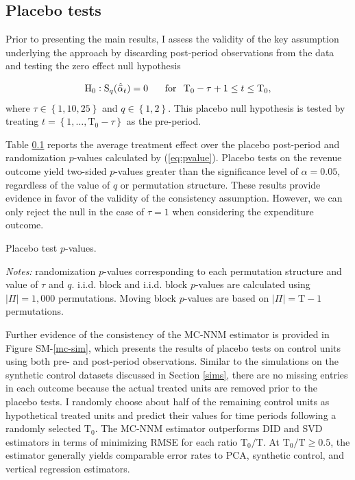 \documentclass[hidelinks,12pt]{article}
\begin{document}
\subsection{Placebo tests} \label{placebo-tests}

Prior to presenting the main results, I assess the validity of the key assumption underlying the approach by discarding post-period observations from the data and testing the zero effect null hypothesis 

\begin{equation} \label{h0-placebo}
\text{H}_0: \text{S}_q (\hat{\bar{\alpha}}_{t}) = 0  \, \hspace{5mm} \,  \text{for} \, \hspace{2mm}  \text{T}_0 - \tau +1 \leq t \leq  \text{T}_0,
\end{equation}
\noindent
where $\tau \in \left\{1, 10, 25\right\}$ and $q \in \left\{1, 2\right\}$. This placebo null hypothesis is tested by treating $t = \left\{1, \ldots,  \text{T}_0 - \tau\right\}$ as the pre-period.

Table \ref{placebo-tests} reports the average treatment effect over the placebo post-period and randomization $p$-values calculated by (\ref{eq:pvalue}). Placebo tests on the revenue outcome yield two-sided $p$-values greater than the significance level of $\alpha = 0.05$, regardless of the value of $q$ or permutation structure. These results provide evidence in favor of the validity of the consistency assumption. However, we can only reject the null in the case of $\tau=1$ when considering the expenditure outcome. 

\begin{table}[htbp]
	\captionsetup{font=normalsize}
	\caption{Placebo test $p$-values.\label{placebo-tests}}
	\begin{center}
		\scalebox{.95}{}
	\end{center}
	\footnotesize{\emph{Notes:} randomization $p$-values corresponding to each permutation structure and value of $\tau$ and $q$. i.i.d. block and i.i.d. block $p$-values are calculated using $|\Pi| = 1,000$ permutations. Moving block $p$-values are based on $|\Pi| = \text{T}-1$ permutations.}
\end{table}

Further evidence of the consistency of the MC-NNM estimator is provided in Figure SM-\ref{mc-sim}, which presents the results of placebo tests on control units using both pre- and post-period observations. Similar to the simulations on the synthetic control datasets discussed in Section \ref{sims}, there are no missing entries in each outcome because the actual treated units are removed prior to the placebo tests. I randomly choose about half of the remaining control units as hypothetical treated units and predict their values for time periods following a randomly selected $\text{T}_0$. The MC-NNM estimator outperforms DID and SVD estimators in terms of minimizing RMSE for each ratio $\text{T}_0/\text{T}$. At $\text{T}_0/\text{T} \geq 0.5$, the estimator generally yields comparable error rates to PCA, synthetic control, and vertical regression estimators. 
\end{document}
